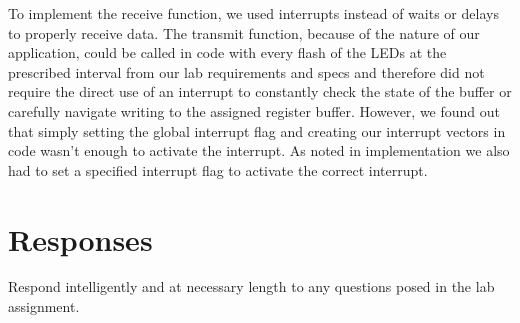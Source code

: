 \documentclass[letterpaper,11pt]{texMemo} %
\begin{document}
To implement the receive function, we used interrupts instead of waits or delays to properly receive data. The transmit function, because of the nature of our application, could be called in code with every flash of the LEDs at the prescribed interval from our lab requirements and specs and therefore did not require the direct use of an interrupt to constantly check the state of the buffer or carefully navigate writing to the assigned register buffer.  However, we found out that simply setting the global interrupt flag and creating our interrupt vectors in code wasn’t enough to activate the interrupt. As noted in implementation we also had to set a specified interrupt flag to activate the correct interrupt.

\newpage
\section*{Responses}
Respond intelligently and at necessary length to any questions posed in the lab assignment.
\end{document}
